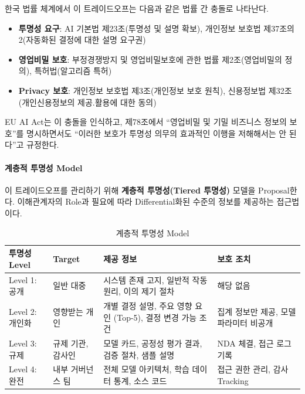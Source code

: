 한국 법률 체계에서 이 트레이드오프는 다음과 같은 법률 간 충돌로 나타난다.

\begin{itemize}
 \item \textbf{투명성 요구}: 
 AI 기본법 제23조(투명성 및 설명 확보), 
 개인정보 보호법 제37조의2(자동화된 결정에 대한 설명 요구권)
 
 \item \textbf{영업비밀 보호}: 
 부정경쟁방지 및 영업비밀보호에 관한 법률 제2조(영업비밀의 정의),
 특허법(알고리즘 특허)
 
 \item \textbf{Privacy 보호}: 
 개인정보 보호법 제3조(개인정보 보호 원칙),
 신용정보법 제32조(개인신용정보의 제공.활용에 대한 동의)
\end{itemize}

EU AI Act는 이 충돌을 인식하고, 
제78조에서 ``영업비밀 및 기밀 비즈니스 정보의 보호''를 명시하면서도 
``이러한 보호가 투명성 의무의 효과적인 이행을 저해해서는 안 된다''고 규정한다.


\paragraph{계층적 투명성 Model}

이 트레이드오프를 관리하기 위해 \textbf{계층적 투명성(Tiered 투명성)} 모델을 Proposal한다. 
이해관계자의 Role과 필요에 따라 Differential화된 수준의 정보를 제공하는 접근법이다.

\begin{table}[htbp]
\centering
\caption{계층적 투명성 Model}
\label{tab:tiered_transparency}
\begin{tabular}{p{2.5cm}p{3cm}p{4cm}p{4cm}}
\toprule
\textbf{투명성 Level} & \textbf{Target} & \textbf{제공 정보} & \textbf{보호 조치} \\
\midrule
Level 1: 공개 & 
일반 대중 & 
시스템 존재 고지, 일반적 작동 원리, 이의 제기 절차 & 
해당 없음 \\
\midrule
Level 2: 개인화 & 
영향받는 개인 & 
개별 결정 설명, 주요 영향 요인 (Top-5), 결정 변경 가능 조건 & 
집계 정보만 제공, 모델 파라미터 비공개 \\
\midrule
Level 3: 규제 & 
규제 기관, 감사인 & 
모델 카드, 공정성 평가 결과, 검증 절차, 샘플 설명 & 
NDA 체결, 접근 로그 기록 \\
\midrule
Level 4: 완전 & 
내부 거버넌스 팀 & 
전체 모델 아키텍처, 학습 데이터 통계, 소스 코드 & 
접근 권한 관리, 감사 Tracking \\
\bottomrule
\end{tabular}
\end{table}


